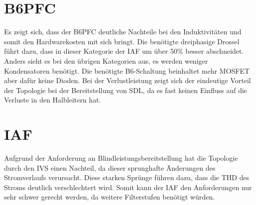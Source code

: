 \section{B6PFC}
Es zeigt sich, dass der \gls{B6PFC} deutliche Nachteile bei den Induktivitäten und somit den Hardwarekosten mit sich bringt. Die benötigte dreiphasige Drossel führt dazu, dass in dieser Kategorie der IAF um über 50\% besser abschneidet.
Anders sieht es bei den übrigen Kategorien aus, es werden weniger Kondensatoren benötigt. Die benötigte B6-Schaltung beinhaltet mehr \gls{MOSFET} aber dafür keine Dioden. Bei der Verlustleistung zeigt sich der eindeutige Vorteil der Topologie bei der Bereitstellung von \gls{SDL}, da es fast keinen Einfluss auf die Verluste in den Halbleitern hat. 

\section{IAF}
Aufgrund der Anforderung an Blindleistungsbereitstellung hat die Topologie durch den \gls{IVS} einen Nachteil, da dieser sprunghafte Änderungen des Stromverlaufs verursacht. Diese starken Sprünge führen dazu, dass die \gls{THD} des Stroms deutlich verschlechtert wird. Somit kann der \gls{IAF} den Anforderungen nur sehr schwer gerecht werden, da weitere Filterstufen benötigt würden.